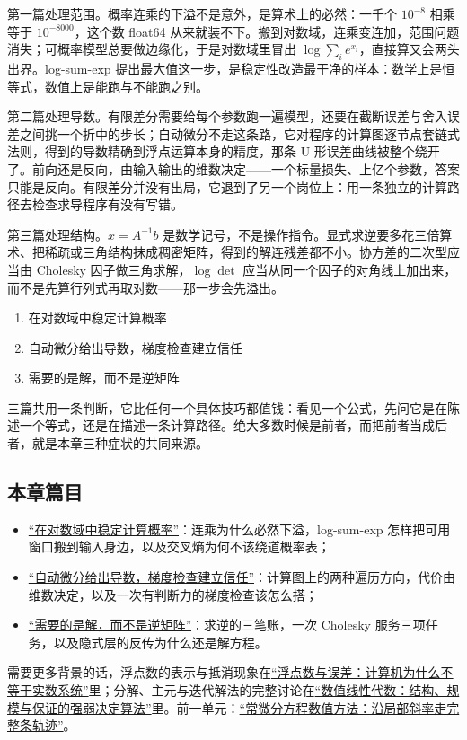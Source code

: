 第一篇处理范围。概率连乘的下溢不是意外，是算术上的必然：一千个 \(10^{-8}\) 相乘等于 \(10^{-8000}\)，这个数 float64 从来就装不下。搬到对数域，连乘变连加，范围问题消失；可概率模型总要做边缘化，于是对数域里冒出 \(\log\sum_i e^{x_i}\)，直接算又会两头出界。log-sum-exp 提出最大值这一步，是稳定性改造最干净的样本：数学上是恒等式，数值上是能跑与不能跑之别。

第二篇处理导数。有限差分需要给每个参数跑一遍模型，还要在截断误差与舍入误差之间挑一个折中的步长；自动微分不走这条路，它对程序的计算图逐节点套链式法则，得到的导数精确到浮点运算本身的精度，那条 U 形误差曲线被整个绕开了。前向还是反向，由输入输出的维数决定——一个标量损失、上亿个参数，答案只能是反向。有限差分并没有出局，它退到了另一个岗位上：用一条独立的计算路径去检查求导程序有没有写错。

第三篇处理结构。\(x=A^{-1}b\) 是数学记号，不是操作指令。显式求逆要多花三倍算术、把稀疏或三角结构抹成稠密矩阵，得到的解连残差都不小。协方差的二次型应当由 Cholesky 因子做三角求解，\(\log\det\) 应当从同一个因子的对角线上加出来，而不是先算行列式再取对数——那一步会先溢出。

\begin{enumerate}
\tightlist
\item
  在对数域中稳定计算概率
\item
  自动微分给出导数，梯度检查建立信任
\item
  需要的是解，而不是逆矩阵
\end{enumerate}

三篇共用一条判断，它比任何一个具体技巧都值钱：看见一个公式，先问它是在陈述一个等式，还是在描述一条计算路径。绝大多数时候是前者，而把前者当成后者，就是本章三种症状的共同来源。

\subsection{本章篇目}

\begin{itemize}
\tightlist
\item \hyperref[sec:08-Numerical-Analysis/07-Numerical-Methods-for-ML/01]{``在对数域中稳定计算概率''}：连乘为什么必然下溢，log-sum-exp 怎样把可用窗口搬到输入身边，以及交叉熵为何不该绕道概率表；
\item \hyperref[sec:08-Numerical-Analysis/07-Numerical-Methods-for-ML/02]{``自动微分给出导数，梯度检查建立信任''}：计算图上的两种遍历方向，代价由维数决定，以及一次有判断力的梯度检查该怎么搭；
\item \hyperref[sec:08-Numerical-Analysis/07-Numerical-Methods-for-ML/03]{``需要的是解，而不是逆矩阵''}：求逆的三笔账，一次 Cholesky 服务三项任务，以及隐式层的反传为什么还是解方程。
\end{itemize}

需要更多背景的话，浮点数的表示与抵消现象在\hyperref[ch:061]{``浮点数与误差：计算机为什么不等于实数系统''}里；分解、主元与迭代解法的完整讨论在\hyperref[ch:065]{``数值线性代数：结构、规模与保证的强弱决定算法''}里。前一单元：\hyperref[ch:066]{``常微分方程数值方法：沿局部斜率走完整条轨迹''}。
